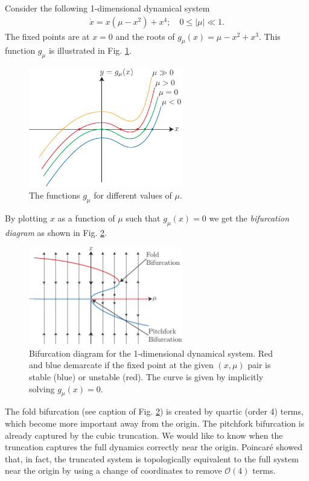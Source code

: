 \begin{ex}
	Consider the following 1-dimensional dynamical system
	\begin{align}
		\dot{x}=x(\mu -x^2)+x^4;\quad 0 \leq| \mu| \ll 1.
	\end{align}
	The fixed points are at $x=0$ and the roots of $g_\mu (x) = \mu -x^2 + x^3$. This function $g_\mu $ is illustrated in Fig. \ref{fig:gmu_roots}.
	\begin{figure}[h!]
		\centering
		\includegraphics[width=0.6\textwidth]{figures/ch3/7gmu_roots.pdf}
		\caption{The functions $g_\mu $ for different values of $\mu $.}
		\label{fig:gmu_roots}
	\end{figure}
	By plotting $x$ as a function of $\mu $ such that $g_{\mu }(x)=0$ we get the \emph{bifurcation diagram} as shown in Fig. \ref{fig:gmu_bifurc}.
	\begin{figure}[h!]
		\centering
		\includegraphics[width=0.6\textwidth]{figures/ch3/8gmu_bifurc.pdf}
		\caption{Bifurcation diagram for the 1-dimensional dynamical system. Red and blue demarcate if the fixed point at the given $(x, \mu)$ pair is stable (blue) or unstable (red). The curve is given by implicitly solving $g_{\mu}(x)=0$.}
		\label{fig:gmu_bifurc}
	\end{figure}

	The fold bifurcation (see caption of Fig. \ref{fig:gmu_bifurc}) is created by quartic (order 4) terms, which become more important away from the origin. The pitchfork bifurcation is already captured by the cubic truncation. We would like to know when the truncation captures the full dynamics correctly near the origin. Poincaré showed that, in fact, the truncated system is topologically equivalent to the full system near the origin by using a change of coordinates to remove $\mathcal{O}(4)$ terms.


\end{ex}
